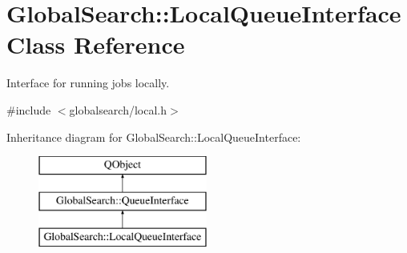 \hypertarget{classGlobalSearch_1_1LocalQueueInterface}{}\section{Global\+Search\+:\+:Local\+Queue\+Interface Class Reference}
\label{classGlobalSearch_1_1LocalQueueInterface}


Interface for running jobs locally.  




{\ttfamily \#include $<$globalsearch/local.\+h$>$}

Inheritance diagram for Global\+Search\+:\+:Local\+Queue\+Interface\+:\begin{figure}[H]
\begin{center}
\leavevmode
\includegraphics[height=3.000000cm]{classGlobalSearch_1_1LocalQueueInterface}
\end{center}
\end{figure}
